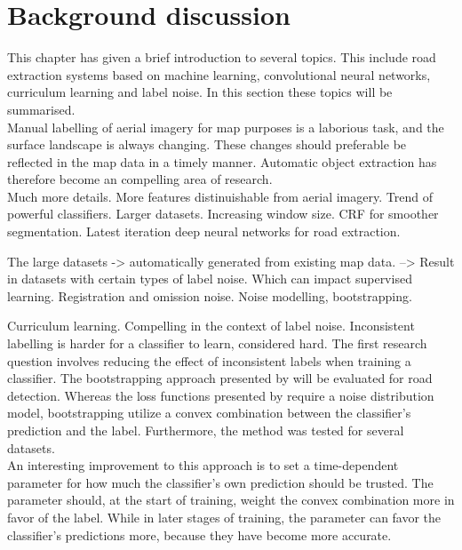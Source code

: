 \section{Background discussion}
\label{sec:backgroundDiscussion}
This chapter has given a brief introduction to several topics. This include road extraction systems based on machine learning, convolutional neural networks, curriculum learning and label noise. In this section these topics will be summarised. \\

Manual labelling of aerial imagery for map purposes is a laborious task, and the surface landscape is always changing. These changes should preferable be reflected in the map data in a timely manner. Automatic object extraction has therefore become an compelling area of research.\\

Much more details. More features distinuishable from aerial imagery. Trend of powerful classifiers. Larger datasets. Increasing window size. CRF for smoother segmentation. Latest iteration deep neural networks for road extraction.

The large datasets -> automatically generated from existing map data. --> Result in datasets with certain types of label noise. Which can impact supervised learning. Registration and omission noise. Noise modelling, bootstrapping.

Curriculum learning. Compelling in the context of label noise. Inconsistent labelling is harder for a classifier to learn, considered hard. 
 The first research question involves reducing the effect of inconsistent labels when training a classifier. The bootstrapping approach presented by \cite{Reed_noisy_labels_bootstrapping} will be evaluated for road detection. Whereas the loss functions presented by \citep{Mnih_aerial_images_noisy} require a noise distribution model,  bootstrapping utilize a  convex combination between the classifier's prediction and the label. Furthermore, the method was tested for several datasets.\\

 An interesting improvement to this approach is to set a time-dependent parameter for how much the classifier's own prediction should be trusted. The parameter should, at the start of training, weight the convex combination more in favor of the label. While in later stages of training, the parameter can favor the classifier's predictions more, because they have become more accurate.\\

